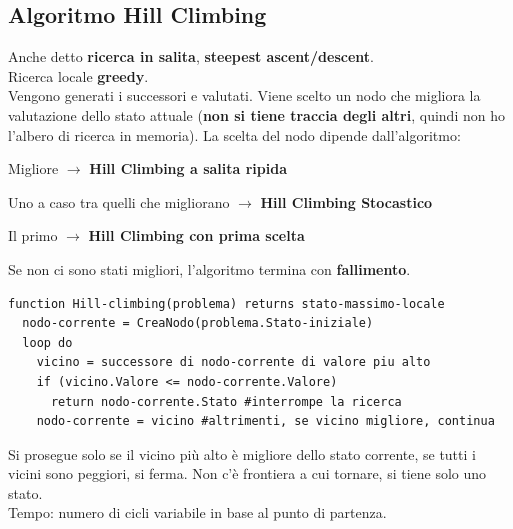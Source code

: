 \documentclass[10pt]{book}
\begin{document}
\subsection{Algoritmo Hill Climbing}
Anche detto \textbf{ricerca in salita}, \textbf{steepest ascent/descent}.\\
Ricerca locale \textbf{greedy}.\\
Vengono generati i successori e valutati. Viene scelto un nodo che migliora la valutazione dello stato attuale (\textbf{non si tiene traccia degli altri}, quindi non ho l'albero di ricerca in memoria). La scelta del nodo dipende dall'algoritmo:
\begin{list}{}{}
	\item Migliore $\rightarrow$ \textbf{Hill Climbing a salita ripida}
	\item Uno a caso tra quelli che migliorano $\rightarrow$ \textbf{Hill Climbing Stocastico}
	\item Il primo $\rightarrow$ \textbf{Hill Climbing con prima scelta}
\end{list}
Se non ci sono stati migliori, l'algoritmo termina con \textbf{fallimento}.
\begin{lstlisting}
function Hill-climbing(problema) returns stato-massimo-locale
  nodo-corrente = CreaNodo(problema.Stato-iniziale)
  loop do
    vicino = successore di nodo-corrente di valore piu alto
    if (vicino.Valore <= nodo-corrente.Valore)
      return nodo-corrente.Stato #interrompe la ricerca
    nodo-corrente = vicino #altrimenti, se vicino migliore, continua
\end{lstlisting}
Si prosegue solo se il vicino più alto è migliore dello stato corrente, se tutti i vicini sono peggiori, si ferma. Non c'è frontiera a cui tornare, si tiene solo uno stato.\\
Tempo: numero di cicli variabile in base al punto di partenza.
\pagebreak
\end{document}
